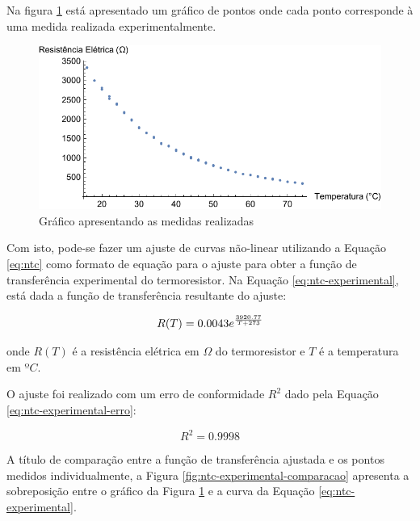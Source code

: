 \documentclass[a4paper]{instrumentacao}
\begin{document}
Na figura \ref{fig:ntc-medidas} está apresentado um gráfico de pontos onde cada ponto corresponde à uma medida realizada experimentalmente.

\begin{figure}[H]
\center
\includegraphics[width=\textwidth]{NTC-MeasurementsPlot.pdf}
\caption{Gráfico apresentando as medidas realizadas}
\label{fig:ntc-medidas}
\end{figure}

Com isto, pode-se fazer um ajuste de curvas não-linear utilizando a Equação \ref{eq:ntc} como formato de equação para o ajuste para obter a função de transferência experimental do termoresistor. Na Equação \ref{eq:ntc-experimental}, está dada a função de transferência resultante do ajuste:

\begin{equation} \large
	R(T) = 0.0043 e^{\frac{3920.77}{T+273}}
	\label{eq:ntc-experimental}
\end{equation}

\noindent onde $R(T)$ é a resistência elétrica em $\Omega$ do termoresistor e $T$ é a temperatura em $ºC$.

O ajuste foi realizado com um erro de conformidade $R^2$ dado pela Equação \ref{eq:ntc-experimental-erro}:

\begin{equation}
	R^2 = 0.9998
	\label{eq:ntc-experimental-erro}
\end{equation}

A título de comparação entre a função de transferência ajustada e os pontos medidos individualmente, a Figura \ref{fig:ntc-experimental-comparacao} apresenta a sobreposição entre o gráfico da Figura \ref{fig:ntc-medidas} e a curva da Equação \ref{eq:ntc-experimental}.
\end{document}
